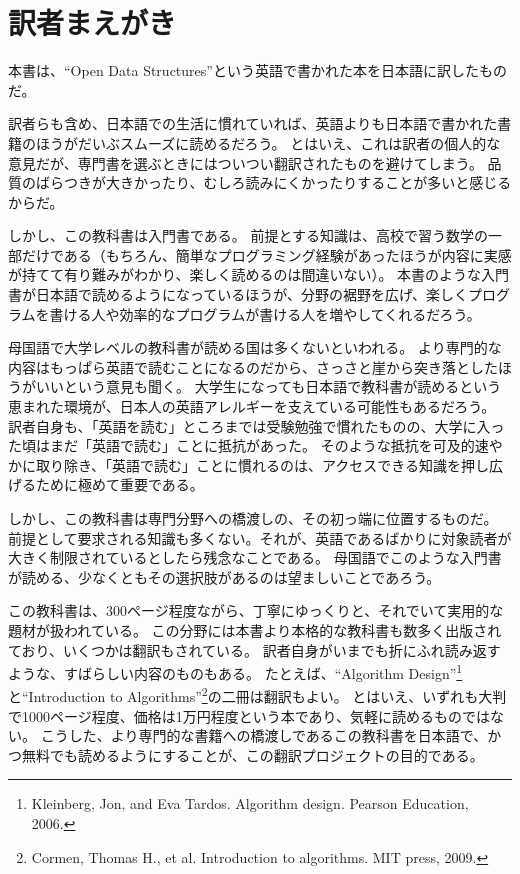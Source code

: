 \chapter*{訳者まえがき}

本書は、``Open Data Structures''という英語で書かれた本を日本語に訳したものだ。

訳者らも含め、日本語での生活に慣れていれば、英語よりも日本語で書かれた書籍のほうがだいぶスムーズに読めるだろう。
とはいえ、これは訳者の個人的な意見だが、専門書を選ぶときにはついつい翻訳されたものを避けてしまう。
品質のばらつきが大きかったり、むしろ読みにくかったりすることが多いと感じるからだ。

しかし、この教科書は入門書である。
前提とする知識は、高校で習う数学の一部だけである（もちろん、簡単なプログラミング経験があったほうが内容に実感が持てて有り難みがわかり、楽しく読めるのは間違いない）。
本書のような入門書が日本語で読めるようになっているほうが、分野の裾野を広げ、楽しくプログラムを書ける人や効率的なプログラムが書ける人を増やしてくれるだろう。

母国語で大学レベルの教科書が読める国は多くないといわれる。
より専門的な内容はもっぱら英語で読むことになるのだから、さっさと崖から突き落としたほうがいいという意見も聞く。
大学生になっても日本語で教科書が読めるという恵まれた環境が、日本人の英語アレルギーを支えている可能性もあるだろう。
訳者自身も、「英語を読む」ところまでは受験勉強で慣れたものの、大学に入った頃はまだ「英語で読む」ことに抵抗があった。
そのような抵抗を可及的速やかに取り除き、「英語で読む」ことに慣れるのは、アクセスできる知識を押し広げるために極めて重要である。

しかし、この教科書は専門分野への橋渡しの、その初っ端に位置するものだ。
前提として要求される知識も多くない。それが、英語であるばかりに対象読者が大きく制限されているとしたら残念なことである。
母国語でこのような入門書が読める、少なくともその選択肢があるのは望ましいことであろう。

この教科書は、300ページ程度ながら、丁寧にゆっくりと、それでいて実用的な題材が扱われている。
この分野には本書より本格的な教科書も数多く出版されており、いくつかは翻訳もされている。
訳者自身がいまでも折にふれ読み返すような、すばらしい内容のものもある。
たとえば、``Algorithm Design''\footnote{Kleinberg, Jon, and Eva Tardos. Algorithm design. Pearson Education, 2006.}と``Introduction to Algorithms''\footnote{Cormen, Thomas H., et al. Introduction to algorithms. MIT press, 2009.}の二冊は翻訳もよい。
とはいえ、いずれも大判で1000ページ程度、価格は1万円程度という本であり、気軽に読めるものではない。
こうした、より専門的な書籍への橋渡しであるこの教科書を日本語で、かつ無料でも読めるようにすることが、この翻訳プロジェクトの目的である。

